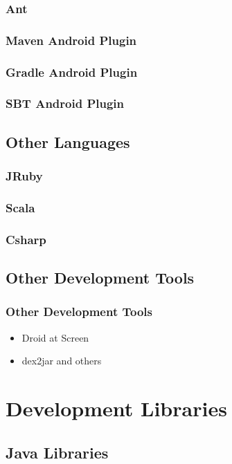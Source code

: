 \documentclass{beamer}
\begin{document}
    \begin{frame}
      \frametitle{Ant}
    \end{frame}

    \begin{frame}
      \frametitle{Maven Android Plugin}
    \end{frame}

    \begin{frame}
      \frametitle{Gradle Android Plugin}
    \end{frame}

    \begin{frame}
      \frametitle{SBT Android Plugin}
    \end{frame}

  \subsection{Other Languages}
    \begin{frame}
      \frametitle{JRuby}
    \end{frame}

    \begin{frame}
      \frametitle{Scala}
    \end{frame}

    \begin{frame}
      \frametitle{Csharp}
    \end{frame}

  \subsection{Other Development Tools}

    \begin{frame}
      \frametitle{Other Development Tools}
      \begin{itemize}
        \item<1->Droid at Screen 
        \item<2->dex2jar and others
      \end{itemize}
    \end{frame}

\section{Development Libraries}
  \subsection{Java Libraries}
\end{document}
